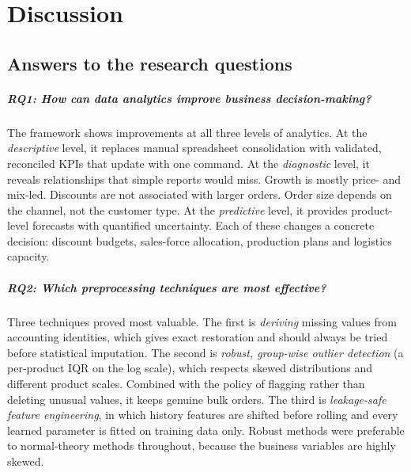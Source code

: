 \chapter{Discussion}\label{ch:discussion}

\section{Answers to the research questions}

\paragraph{RQ1: How can data analytics improve business decision-making?}
The framework shows improvements at all three levels of analytics. At the \emph{descriptive} level, it replaces
manual spreadsheet consolidation with validated, reconciled KPIs that update with one command. At the
\emph{diagnostic} level, it reveals relationships that simple reports would miss. Growth is mostly price- and
mix-led. Discounts are not associated with larger orders. Order size depends on the channel, not the customer
type. At the \emph{predictive} level, it provides product-level forecasts with quantified uncertainty. Each of
these changes a concrete decision: discount budgets, sales-force allocation, production plans and logistics
capacity.

\paragraph{RQ2: Which preprocessing techniques are most effective?}
Three techniques proved most valuable. The first is \emph{deriving} missing values from accounting identities,
which gives exact restoration and should always be tried before statistical imputation. The second is
\emph{robust, group-wise outlier detection} (a per-product IQR on the log scale), which respects skewed
distributions and different product scales. Combined with the policy of flagging rather than deleting unusual
values, it keeps genuine bulk orders. The third is \emph{leakage-safe feature engineering}, in which history
features are shifted before rolling and every learned parameter is fitted on training data only. Robust
methods were preferable to normal-theory methods throughout, because the business variables are highly skewed.

